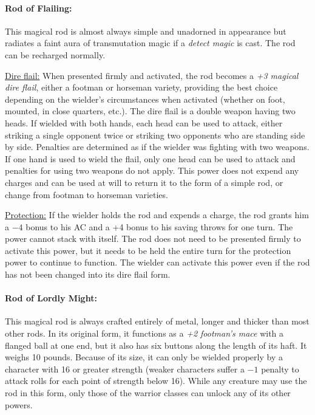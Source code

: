 \begin{multicols}{2}
\paragraph{Rod of Flailing:} This magical rod is almost always simple and unadorned in appearance but radiates a faint aura of transmutation magic if a \textit{detect magic} is cast.    The rod can be recharged normally.

\underline{Dire flail:} When presented firmly and activated, the rod becomes a \textit{+3 magical dire flail}, either a footman or horseman variety, providing the best choice depending on the wielder's circumstances when activated (whether on foot, mounted, in close quarters, etc.).  The dire flail is a double weapon having two heads.  If wielded with both hands, each head can be used to attack, either striking a single opponent twice or striking two opponents who are standing side by side.  Penalties are determined as if the wielder was fighting with two weapons.  If one hand is used to wield the flail, only one head can be used to attack and penalties for using two weapons do not apply.  This power does not expend any charges and can be used at will to return it to the form of a simple rod, or change from footman to horseman varieties.

\underline{Protection:} If the wielder holds the rod and expends a charge, the rod grants him a $-4$ bonus to his AC and a +4 bonus to his saving throws for one turn.  The power cannot stack with itself.  The rod does not need to be presented firmly to activate this power, but it needs to be held the entire turn for the protection power to continue to function.  The wielder can activate this power even if the rod has not been changed into its dire flail form.  

\paragraph{Rod of Lordly Might:} This magical rod is always crafted entirely of metal, longer and thicker than most other rods.  In its original form, it functions as a \textit{+2 footman's mace} with a flanged ball at one end, but it also has six buttons along the length of its haft.  It weighs 10 pounds.  Because of its size, it can only be wielded properly by a character with 16 or greater strength (weaker characters suffer a $-1$ penalty to attack rolls for each point of strength below 16).  While any creature may use the rod in this form, only those of the warrior classes can unlock any of its other powers.


\end{multicols}
